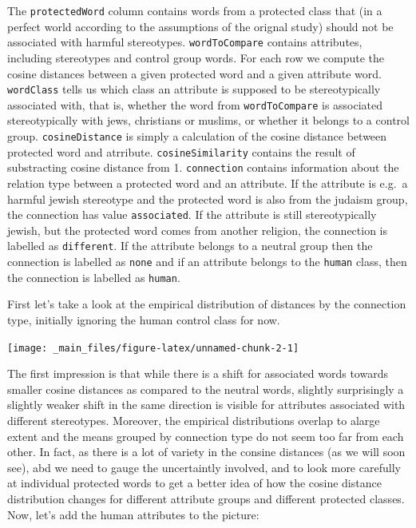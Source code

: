 \documentclass[]{book}
\begin{document}
\normalsize

The \texttt{protectedWord} column contains words from a protected class
that (in a perfect world according to the assumptions of the orignal
study) should not be associated with harmful stereotypes.
\texttt{wordToCompare} contains attributes, including stereotypes and
control group words. For each row we compute the cosine distances
between a given protected word and a given attribute word.
\texttt{wordClass} tells us which class an attribute is supposed to be
stereotypically associated with, that is, whether the word from
\texttt{wordToCompare} is associated stereotypically with jews,
christians or muslims, or whether it belongs to a control group.
\texttt{cosineDistance} is simply a calculation of the cosine distance
between protected word and atrribute. \texttt{cosineSimilarity} contains
the result of substracting cosine distance from 1. \texttt{connection}
contains information about the relation type between a protected word
and an attribute. If the attribute is e.g.~a harmful jewish stereotype
and the protected word is also from the judaism group, the connection
has value \texttt{associated}. If the attribute is still stereotypically
jewish, but the protected word comes from another religion, the
connection is labelled as \texttt{different}. If the attribute belongs
to a neutral group then the connection is labelled as \texttt{none} and
if an attribute belongs to the \texttt{human} class, then the connection
is labelled as \texttt{human}.

First let's take a look at the empirical distribution of distances by
the connection type, initially ignoring the human control class for now.

\vspace{1mm} \footnotesize

\begin{center}\texttt{[image: \_main\_files/figure-latex/unnamed-chunk-2-1]} \end{center}

\normalsize

The first impression is that while there is a shift for associated words
towards smaller cosine distances as compared to the neutral words,
slightly surprisingly a slightly weaker shift in the same direction is
visible for attributes associated with different stereotypes. Moreover,
the empirical distributions overlap to alarge extent and the means
grouped by connection type do not seem too far from each other. In fact,
as there is a lot of variety in the consine distances (as we will soon
see), abd we need to gauge the uncertaintly involved, and to look more
carefully at individual protected words to get a better idea of how the
cosine distance distribution changes for different attribute groups and
different protected classes. Now, let's add the human attributes to the
picture:
\end{document}

